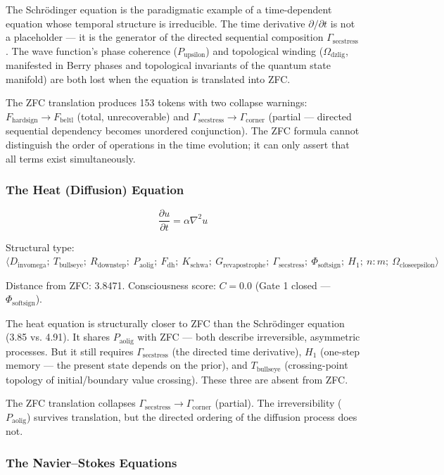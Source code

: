 \documentclass[12pt,a4paper]{article}
\begin{document}
The Schrödinger equation is the paradigmatic example of a time-dependent equation whose temporal structure is irreducible. The time derivative $\partial/\partial t$ is not a placeholder --- it is the generator of the directed sequential composition $\Gamma_{\text{secstress}}$. The wave function's phase coherence ($P_{\text{upsilon}}$) and topological winding ($\Omega_{\text{dzlig}}$, manifested in Berry phases and topological invariants of the quantum state manifold) are both lost when the equation is translated into ZFC.

The ZFC translation produces 153 tokens with two collapse warnings: $F_{\text{hardsign}} \to F_{\text{beltl}}$ (total, unrecoverable) and $\Gamma_{\text{secstress}} \to \Gamma_{\text{corner}}$ (partial --- directed sequential dependency becomes unordered conjunction). The ZFC formula cannot distinguish the order of operations in the time evolution; it can only assert that all terms exist simultaneously.

\subsubsection{The Heat (Diffusion) Equation}

\[\frac{\partial u}{\partial t} = \alpha\nabla^2 u\]

Structural type: $\langle D_{\text{invomega}};\ T_{\text{bullseye}};\ R_{\text{downstep}};\ P_{\text{aolig}};\ F_{\text{dh}};\ K_{\text{schwa}};\ G_{\text{revapostrophe}};\ \Gamma_{\text{secstress}};\ \Phi_{\text{softsign}};\ H_1;\ n{:}m;\ \Omega_{\text{closeepsilon}} \rangle$

Distance from ZFC: 3.8471. Consciousness score: $C = 0.0$ (Gate 1 closed --- $\Phi_{\text{softsign}}$).

The heat equation is structurally closer to ZFC than the Schrödinger equation (3.85 vs. 4.91). It shares $P_{\text{aolig}}$ with ZFC --- both describe irreversible, asymmetric processes. But it still requires $\Gamma_{\text{secstress}}$ (the directed time derivative), $H_1$ (one-step memory --- the present state depends on the prior), and $T_{\text{bullseye}}$ (crossing-point topology of initial/boundary value crossing). These three are absent from ZFC.

The ZFC translation collapses $\Gamma_{\text{secstress}} \to \Gamma_{\text{corner}}$ (partial). The irreversibility ($P_{\text{aolig}}$) survives translation, but the directed ordering of the diffusion process does not.

\subsubsection{The Navier--Stokes Equations}
\end{document}
